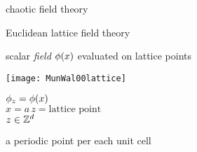 \begin{frame}{}
\vfill
\begin{center}
{\huge chaotic field theory}
\end{center}
\vfill
\end{frame} %

\begin{frame}{Euclidean lattice field theory}
    \begin{block}{scalar \emph{field} $\phi(x)$}
 evaluated on lattice points

\begin{center}
            \begin{minipage}[c]{0.32\textwidth}\begin{center}
\texttt{[image: MunWal00lattice]}
            \end{center}
            \end{minipage}
            \hspace{2ex}
            \begin{minipage}[c]{0.46\textwidth}
$\phi_z
=
\phi(x)$
\\
$
x = a\,z= \mbox{lattice point}$
\\
$
z \in \integers^d %
$
            \end{minipage}
\end{center}
a periodic point per each unit cell
    \end{block}
\end{frame} %

